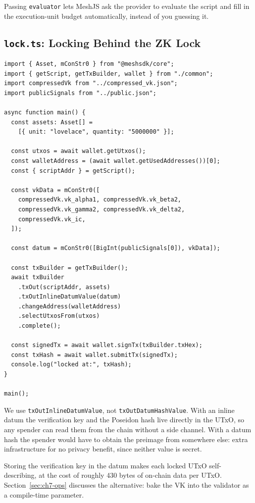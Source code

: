 Passing \texttt{evaluator} lets MeshJS ask the provider to evaluate the script
and fill in the execution-unit budget automatically, instead of you guessing it.

\subsection*{\texttt{lock.ts}: Locking Behind the ZK Lock}

\begin{verbatim}
import { Asset, mConStr0 } from "@meshsdk/core";
import { getScript, getTxBuilder, wallet } from "./common";
import compressedVk from "../compressed_vk.json";
import publicSignals from "../public.json";

async function main() {
  const assets: Asset[] =
    [{ unit: "lovelace", quantity: "5000000" }];

  const utxos = await wallet.getUtxos();
  const walletAddress = (await wallet.getUsedAddresses())[0];
  const { scriptAddr } = getScript();

  const vkData = mConStr0([
    compressedVk.vk_alpha1, compressedVk.vk_beta2,
    compressedVk.vk_gamma2, compressedVk.vk_delta2,
    compressedVk.vk_ic,
  ]);

  const datum = mConStr0([BigInt(publicSignals[0]), vkData]);

  const txBuilder = getTxBuilder();
  await txBuilder
    .txOut(scriptAddr, assets)
    .txOutInlineDatumValue(datum)
    .changeAddress(walletAddress)
    .selectUtxosFrom(utxos)
    .complete();

  const signedTx = await wallet.signTx(txBuilder.txHex);
  const txHash = await wallet.submitTx(signedTx);
  console.log("locked at:", txHash);
}

main();
\end{verbatim}

We use \texttt{txOutInlineDatumValue}, not \texttt{txOutDatumHashValue}. With an
inline datum the verification key and the Poseidon hash live directly in the
UTxO, so any spender can read them from the chain without a side channel. With a
datum hash the spender would have to obtain the preimage from somewhere else:
extra infrastructure for no privacy benefit, since neither value is secret.

\begin{highlight}
Storing the verification key in the datum makes each locked UTxO
self-describing, at the cost of roughly 430 bytes of on-chain data per UTxO.
Section~\ref{sec:ch7-ops} discusses the alternative: bake the VK into the
validator as a compile-time parameter.
\end{highlight}

